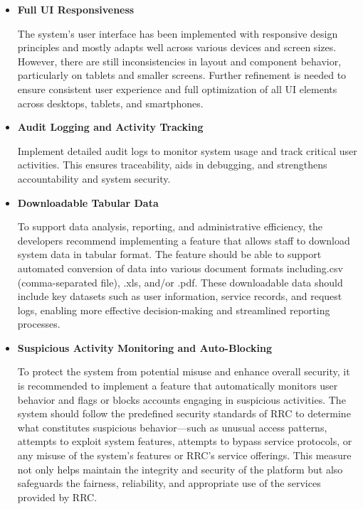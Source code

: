 \begin{itemize}
	\item \textbf{Full UI Responsiveness}
	
	The system’s user interface has been implemented with responsive design principles and mostly adapts well across various devices and screen sizes. However, there are still inconsistencies in layout and component behavior, particularly on tablets and smaller screens. Further refinement is needed to ensure consistent user experience and full optimization of all UI elements across desktops, tablets, and smartphones.

	\item \textbf{Audit Logging and Activity Tracking}
	
	Implement detailed audit logs to monitor system usage and track critical user activities. This ensures traceability, aids in debugging, and strengthens accountability and system security.
	
	\item \textbf{Downloadable Tabular Data}
	
	To support data analysis, reporting, and administrative efficiency, the developers recommend implementing a feature that allows staff to download system data in tabular format. The feature should be able to support automated conversion of data into various document formats including.csv (comma-separated file), .xls,	and/or .pdf. These downloadable data should include key datasets such as user information, service records, and request logs, enabling more effective decision-making and streamlined reporting processes.

	\item \textbf{Suspicious Activity Monitoring and Auto-Blocking}
	
	To protect the system from potential misuse and enhance overall security, it is recommended to implement a feature that automatically monitors user behavior and flags or blocks accounts engaging in suspicious activities. The system should follow the predefined security standards of RRC to determine what constitutes suspicious behavior—such as unusual access patterns, attempts to exploit system features, attempts to bypass service protocols, or any misuse of the system’s features or RRC’s service offerings. This measure not only helps maintain the integrity and security of the platform but also safeguards the fairness, reliability, and appropriate use of the services provided by RRC.
	
\end{itemize}

